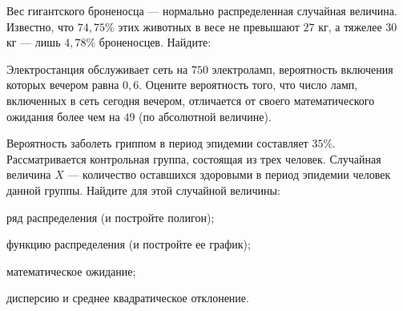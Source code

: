 \begin{zkrPlain}{25}\noindent 
	Вес гигантского броненосца — нормально распределенная случайная величина. Известно, что $74{,}75\%$ этих животных в весе не превышают $27$ кг, а тяжелее $30$ кг — лишь $4{,}78\%$ броненосцев. Найдите: \par {}
 
\end{zkrPlain}

\vfil

\begin{zkrPlain}{25}\noindent 
	Электростанция обслуживает сеть на $ 750 $ электроламп, вероятность включения которых вечером равна $ 0{,}6 $. Оцените вероятность того, что число ламп, включенных в сеть сегодня вечером, отличается от своего математического ожидания более чем на $ 49 $ (по абсолютной величине). 
 
\end{zkrPlain}

\newpage\setcounter{zad}{0}\setcounter{footnote}{0}



\begin{zkrPlain}{25}\noindent 
	Вероятность заболеть гриппом в период эпидемии составляет $35\%$. Рассматривается контрольная группа, состоящая из трех человек. Случайная величина $X$ --- количество оставшихся здоровыми в период эпидемии человек данной группы.  Найдите для этой случайной величины: \par \smallskip\small{ \par \zz ряд распределения (и постройте полигон); \par \zz функцию распределения (и постройте ее график); \par \zz математическое ожидание; \par \zz дисперсию и среднее квадратическое отклонение.\par \par}
 
\end{zkrPlain}

\vfil

